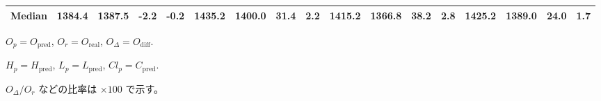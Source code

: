 \begin{threeparttable}
{\begin{tabular}{lrrrrrrrrrrrrrrrr}
 Median & 1384.4 & 1387.5 &       -2.2 &           -0.2 & 1435.2 & 1400.0 &       31.4 &            2.2 & 1415.2 & 1366.8 &       38.2 &            2.8 & 1425.2 & 1389.0 &        24.0 &              1.7 \\
\bottomrule
\end{tabular}
}
\begin{tablenotes}\footnotesize
\item $O_p=O_{\text{pred}}$, $O_r=O_{\text{real}}$, $O_\Delta=O_{\text{diff}}$.
\item $H_p=H_{\text{pred}}$, $L_p=L_{\text{pred}}$, $Cl_p=C_{\text{pred}}$.
\item $O_\Delta/O_r$ などの比率は \(\times100\) で示す。
\end{tablenotes}
\end{threeparttable}
\endgroup
